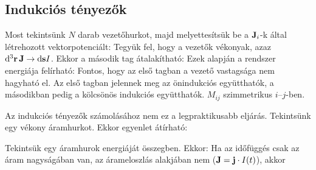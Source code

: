   \subsection{Indukciós tényezők}\label{ss:12-indegyh}
   
   Most tekintsünk $N$ darab vezetőhurkot, majd melyettesítsük be a $\mathbf{J}_i$-k által létrehozott vektorpotenciált:
   Tegyük fel, hogy a vezetők vékonyak, azaz $\mathrm{d}^3\mathbf{r}\, \mathbf{J}\to\mathrm{d} \mathbf{s} I$. Ekkor a második tag átalakítható:
   Ezek alapján a rendszer energiája felírható:
   Fontos, hogy az első tagban a vezető vastagsága nem hagyható el. Az első tagban jelennek meg az önindukciós együtthatók, a másodikban pedig a kölcsönös indukciós együtthatók. $M_{ij}$ szimmetrikus $i$--$j$-ben.
   
   Az indukciós tényezők számolásához nem ez a legpraktikusabb eljárás. Tekintsünk egy vékony áramhurkot. Ekkor  egyenlet átírható:
   
   Tekintsük egy áramhurok energiáját  összegben. Ekkor:
   Ha az időfüggés csak az áram nagyságában van, az árameloszlás alakjában nem ($\mathbf{J}=\mathbf{j}\cdot I(t)$), akkor
   
